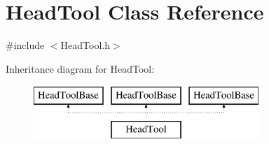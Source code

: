 \hypertarget{class_head_tool}{}\section{Head\+Tool Class Reference}
\label{class_head_tool}


{\ttfamily \#include $<$Head\+Tool.\+h$>$}

Inheritance diagram for Head\+Tool\+:\begin{figure}[H]
\begin{center}
\leavevmode
\includegraphics[height=2.000000cm]{d1/d4f/class_head_tool}
\end{center}
\end{figure}

